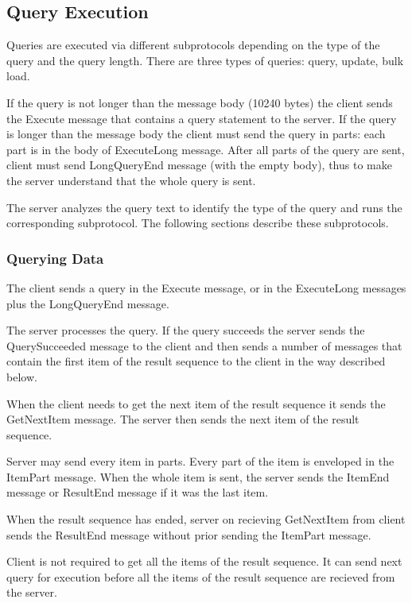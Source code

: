 \documentclass[a4paper,12pt]{article}
\begin{document}
\subsection{Query Execution}

Queries are executed via different subprotocols depending on the type of the query and the query length. There are three types of queries: query, update, bulk load. 

If the query is not longer than the message body (10240 bytes) the client sends the Execute message that contains a query statement to the server. 
If the query is longer than the message body the client must send the query in parts: each part is in the body of ExecuteLong message. After all parts of the query are sent, client must send LongQueryEnd message (with the empty body), thus to make the server understand that the whole query is sent.


The server analyzes the query text to identify the type of the query and runs the corresponding subprotocol. The following sections describe these subprotocols. 

\subsubsection{Querying Data }

The client sends a query in the Execute message, or in the ExecuteLong messages plus the LongQueryEnd message.

The server processes the query. If the query succeeds the server sends the QuerySucceeded message to the client and then sends a number of messages that contain the first item of the result sequence to the client in the way described below.

When the client needs to get the next item of the result sequence it sends the GetNextItem message. The server then sends the next item of the result sequence.

Server may send every item in parts. Every part of the item is enveloped in the ItemPart message. When the whole item is sent, the server sends the ItemEnd message or ResultEnd message if it was the last item.

When the result sequence has ended, server on recieving GetNextItem from client sends the ResultEnd message without prior sending the ItemPart message.

Client is not required to get all the items of the result sequence. It can send next query for execution before all the items of the result sequence are recieved from the server.
 
\end{document}

